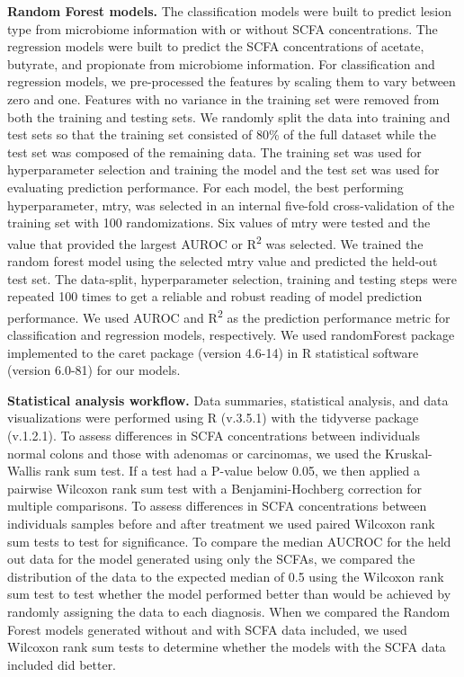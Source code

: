 \documentclass[11pt,]{article}
\begin{document}
\textbf{Random Forest models.} The classification models were built to
predict lesion type from microbiome information with or without SCFA
concentrations. The regression models were built to predict the SCFA
concentrations of acetate, butyrate, and propionate from microbiome
information. For classification and regression models, we pre-processed
the features by scaling them to vary between zero and one. Features with
no variance in the training set were removed from both the training and
testing sets. We randomly split the data into training and test sets so
that the training set consisted of 80\% of the full dataset while the
test set was composed of the remaining data. The training set was used
for hyperparameter selection and training the model and the test set was
used for evaluating prediction performance. For each model, the best
performing hyperparameter, mtry, was selected in an internal five-fold
cross-validation of the training set with 100 randomizations. Six values
of mtry were tested and the value that provided the largest AUROC or
R\textsuperscript{2} was selected. We trained the random forest model
using the selected mtry value and predicted the held-out test set. The
data-split, hyperparameter selection, training and testing steps were
repeated 100 times to get a reliable and robust reading of model
prediction performance. We used AUROC and R\textsuperscript{2} as the
prediction performance metric for classification and regression models,
respectively. We used randomForest package implemented to the caret
package (version 4.6-14) in R statistical software (version 6.0-81) for
our models.

\textbf{Statistical analysis workflow.} Data summaries, statistical
analysis, and data visualizations were performed using R (v.3.5.1) with
the tidyverse package (v.1.2.1). To assess differences in SCFA
concentrations between individuals normal colons and those with adenomas
or carcinomas, we used the Kruskal-Wallis rank sum test. If a test had a
P-value below 0.05, we then applied a pairwise Wilcoxon rank sum test
with a Benjamini-Hochberg correction for multiple comparisons. To assess
differences in SCFA concentrations between individuals samples before
and after treatment we used paired Wilcoxon rank sum tests to test for
significance. To compare the median AUCROC for the held out data for the
model generated using only the SCFAs, we compared the distribution of
the data to the expected median of 0.5 using the Wilcoxon rank sum test
to test whether the model performed better than would be achieved by
randomly assigning the data to each diagnosis. When we compared the
Random Forest models generated without and with SCFA data included, we
used Wilcoxon rank sum tests to determine whether the models with the
SCFA data included did better.
\end{document}
